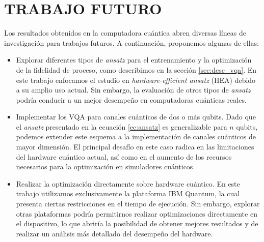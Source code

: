 \documentclass[letterpaper,12pt]{thesisECFM}
\theoremstyle{plain}
\theoremstyle{definition}
\theoremstyle{definition}
\theoremstyle{remark}
\newcommand{\1}{\mathbb{1}}
\begin{document}
\chapter{TRABAJO FUTURO} %
Los resultados obtenidos en la computadora cuántica abren diversas líneas de
investigación para trabajos futuros. A continuación, proponemos algunas de
ellas: 
\begin{itemize}
    \item Explorar diferentes tipos de \textit{ansatz} para el entrenamiento y la optimización de la fidelidad de proceso, como describimos en la sección \ref{sec:desc_vqa}. En este trabajo enfocamos el estudio en \textit{hardware-efficient ansatz} (HEA) debido a su amplio uso actual. Sin embargo, la evaluación de otros tipos de \textit{ansatz} podría conducir a un mejor desempeño en computadoras cuánticas reales.
    
    \item Implementar los VQA para canales cuánticos de dos o más qubits. Dado que el \textit{ansatz} presentado en la ecuación \ref{ec:ansatz} es generalizable para $n$ qubits, podemos extender este esquema a la implementación de canales cuánticos de mayor dimensión. El principal desafío en este caso radica en las limitaciones del hardware cuántico actual, así como en el aumento de los recursos necesarios para la optimización en simuladores cuánticos.
    
    \item Realizar la optimización directamente sobre hardware cuántico. En este trabajo utilizamos exclusivamente la plataforma IBM Quantum, la cual presenta ciertas restricciones en el tiempo de ejecución. Sin embargo, explorar otras plataformas podría permitirnos realizar optimizaciones directamente en el dispositivo, lo que abriría la posibilidad de obtener mejores resultados y de realizar un análisis más detallado del desempeño del hardware.
\end{itemize}


\appendix
\end{document}
